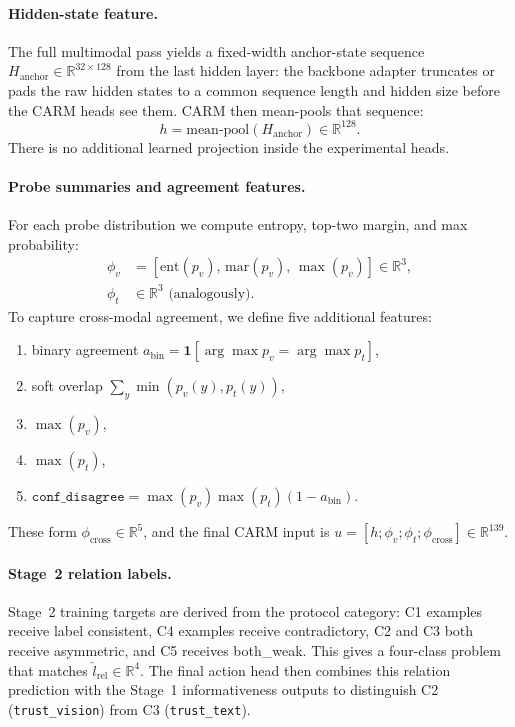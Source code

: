 \documentclass[11pt]{article}
\begin{document}
\paragraph{Hidden-state feature.}
The full multimodal pass yields a fixed-width anchor-state sequence
$H_{\mathrm{anchor}} \in \mathbb{R}^{32 \times 128}$ from the last hidden layer: the
backbone adapter truncates or pads the raw hidden states to a common sequence length and
hidden size before the CARM heads see them. CARM then mean-pools that sequence:
\[
h = \mathrm{mean\text{-}pool}(H_{\mathrm{anchor}}) \in \mathbb{R}^{128}.
\]
There is no additional learned projection inside the experimental heads.

\paragraph{Probe summaries and agreement features.}
For each probe distribution we compute entropy, top-two margin, and max probability:
\begin{align*}
\phi_v &= [\mathrm{ent}(p_v),\, \mathrm{mar}(p_v),\, \max(p_v)] \in \mathbb{R}^3, \\
\phi_t &\in \mathbb{R}^3 \text{ (analogously).}
\end{align*}
To capture cross-modal agreement, we define five additional features:
\begin{enumerate}
\item binary agreement $a_{\text{bin}} = \mathbf{1}[\arg\max p_v = \arg\max p_t]$,
\item soft overlap $\sum_y \min(p_v(y), p_t(y))$,
\item $\max(p_v)$,
\item $\max(p_t)$,
\item $\texttt{conf\_disagree} = \max(p_v)\max(p_t)(1-a_{\text{bin}})$.
\end{enumerate}
These form $\phi_{\text{cross}} \in \mathbb{R}^5$, and the final CARM input is
$u = [h;\phi_v;\phi_t;\phi_{\text{cross}}] \in \mathbb{R}^{139}$.

\paragraph{Stage~2 relation labels.}
Stage~2 training targets are derived from the protocol category: C1 examples receive label
consistent, C4 examples receive contradictory, C2 and C3 both receive asymmetric, and C5
receives both\_weak. This gives a four-class problem that matches
$\hat{l}_{\text{rel}} \in \mathbb{R}^4$.
The final action head then combines this relation prediction with the Stage~1
informativeness outputs to distinguish C2 (\texttt{trust\_vision}) from C3
(\texttt{trust\_text}).
\end{document}

